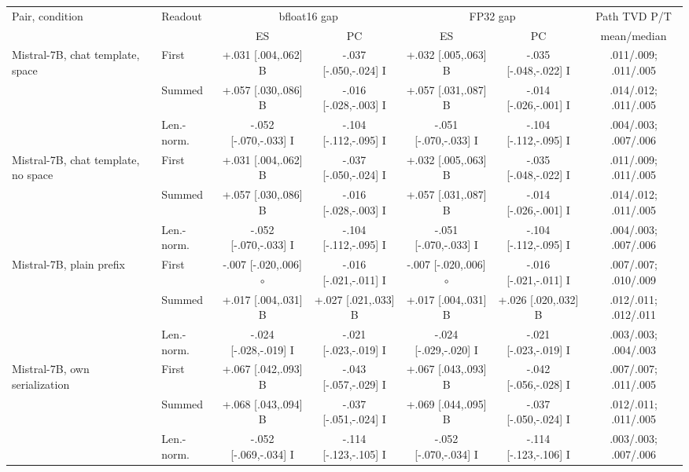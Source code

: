 \begin{table}[t]
\centering\scriptsize
\setlength{\tabcolsep}{2.5pt}
\begin{tabular}{@{}llccccc@{}}
\toprule
Pair, condition & Readout & \multicolumn{2}{c}{bfloat16 gap} & \multicolumn{2}{c}{FP32 gap} & Path TVD P/T \\
\cmidrule(lr){3-4}\cmidrule(lr){5-6} & & ES & PC & ES & PC & mean/median \\
\midrule
Mistral-7B, chat template, space & First & +.031 [.004,.062] B & -.037 [-.050,-.024] I & +.032 [.005,.063] B & -.035 [-.048,-.022] I & .011/.009; .011/.005 \\
 & Summed & +.057 [.030,.086] B & -.016 [-.028,-.003] I & +.057 [.031,.087] B & -.014 [-.026,-.001] I & .014/.012; .011/.005 \\
 & Len.-norm. & -.052 [-.070,-.033] I & -.104 [-.112,-.095] I & -.051 [-.070,-.033] I & -.104 [-.112,-.095] I & .004/.003; .007/.006 \\
\addlinespace[1pt]
Mistral-7B, chat template, no space & First & +.031 [.004,.062] B & -.037 [-.050,-.024] I & +.032 [.005,.063] B & -.035 [-.048,-.022] I & .011/.009; .011/.005 \\
 & Summed & +.057 [.030,.086] B & -.016 [-.028,-.003] I & +.057 [.031,.087] B & -.014 [-.026,-.001] I & .014/.012; .011/.005 \\
 & Len.-norm. & -.052 [-.070,-.033] I & -.104 [-.112,-.095] I & -.051 [-.070,-.033] I & -.104 [-.112,-.095] I & .004/.003; .007/.006 \\
\addlinespace[1pt]
Mistral-7B, plain prefix & First & -.007 [-.020,.006] $\circ$ & -.016 [-.021,-.011] I & -.007 [-.020,.006] $\circ$ & -.016 [-.021,-.011] I & .007/.007; .010/.009 \\
 & Summed & +.017 [.004,.031] B & +.027 [.021,.033] B & +.017 [.004,.031] B & +.026 [.020,.032] B & .012/.011; .012/.011 \\
 & Len.-norm. & -.024 [-.028,-.019] I & -.021 [-.023,-.019] I & -.024 [-.029,-.020] I & -.021 [-.023,-.019] I & .003/.003; .004/.003 \\
\addlinespace[1pt]
Mistral-7B, own serialization & First & +.067 [.042,.093] B & -.043 [-.057,-.029] I & +.067 [.043,.093] B & -.042 [-.056,-.028] I & .007/.007; .011/.005 \\
 & Summed & +.068 [.043,.094] B & -.037 [-.051,-.024] I & +.069 [.044,.095] B & -.037 [-.050,-.024] I & .012/.011; .011/.005 \\
 & Len.-norm. & -.052 [-.069,-.034] I & -.114 [-.123,-.105] I & -.052 [-.070,-.034] I & -.114 [-.123,-.106] I & .003/.003; .007/.006 \\

\end{tabular}
\end{table}
